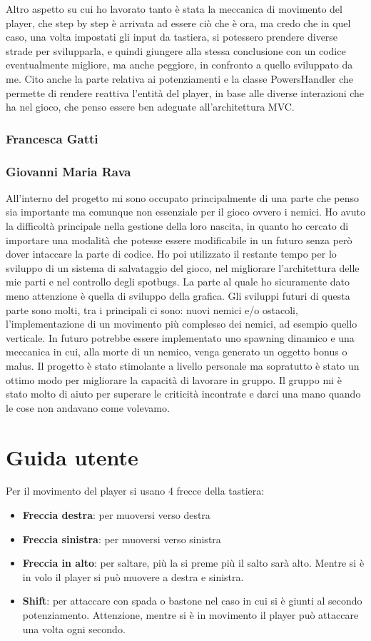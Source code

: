 \documentclass[a4paper,12pt]{report}
\begin{document}
Altro aspetto su cui ho lavorato tanto è stata la meccanica di movimento del player, che step by step è arrivata ad essere ciò che è 
ora, ma credo che in quel caso, una volta impostati gli input da tastiera, si potessero prendere diverse strade per svilupparla, 
e quindi giungere alla stessa conclusione con un codice eventualmente migliore, ma anche peggiore, in confronto a quello sviluppato da me.
Cito anche la parte relativa ai potenziamenti e la classe PowersHandler che permette di rendere reattiva l'entità del player, 
in base alle diverse interazioni che ha nel gioco, che penso essere ben adeguate all'architettura MVC.


\subsection{Francesca Gatti}
\subsection{Giovanni Maria Rava}
All'interno del progetto mi sono occupato principalmente di una parte che penso sia importante ma comunque non essenziale per il 
gioco ovvero i nemici. Ho avuto la difficoltà principale nella gestione della loro nascita, in quanto ho cercato di importare una
modalità che potesse essere modificabile in un futuro senza però dover intaccare la parte di codice. Ho poi utilizzato il restante 
tempo per lo sviluppo di un sistema di salvataggio del gioco, nel migliorare l’architettura delle mie parti e nel controllo degli 
spotbugs. La parte al quale ho sicuramente dato meno attenzione è quella di sviluppo della grafica. Gli sviluppi futuri di questa 
parte sono molti, tra i principali  ci sono: nuovi nemici e/o ostacoli, l’implementazione di un movimento più complesso dei nemici,
ad esempio quello verticale. In futuro potrebbe essere implementato uno spawning dinamico e una meccanica in cui, alla morte di un 
nemico, venga generato un oggetto bonus o malus.
Il progetto è stato stimolante a livello personale ma sopratutto è stato un ottimo modo per migliorare la capacità di lavorare in 
gruppo. Il gruppo mi è stato molto di aiuto per superare le criticità incontrate e darci una mano quando le cose non andavano come 
volevamo.
\appendix
\chapter{Guida utente}
Per il movimento del player si usano 4 frecce della tastiera:
\begin{itemize}
    \item \textbf{Freccia destra}: per muoversi verso destra
    \item \textbf{Freccia sinistra}: per muoversi verso sinistra
    \item \textbf{Freccia in alto}: per saltare, più la si preme più il salto sarà alto.
    Mentre si è in volo il player si può muovere a destra e sinistra.
    \item \textbf{Shift}: per attaccare con spada o bastone nel caso in cui si è giunti al secondo potenziamento.
    Attenzione, mentre si è in movimento il player può attaccare una volta ogni secondo.
\end{itemize}
\end{document}
